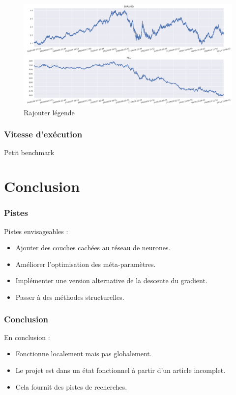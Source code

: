 \documentclass{beamer}
\begin{document}
	\begin{frame}
		\begin{figure}
			\includegraphics[scale=0.275]{res/eursud_2006-2010}
			\caption{Rajouter légende}
		\end{figure}
	\end{frame}

	\begin{frame}
		\frametitle{Vitesse d'exécution}
		Petit benchmark
	\end{frame}

	\section{Conclusion}
	
	\begin{frame}
		\frametitle{Pistes}
		Pistes envisageables :
		\begin{itemize}
			\item Ajouter des couches cachées au réseau de neurones.
			\item Améliorer l'optimisation des méta-paramètres.
			\item Implémenter une version alternative de la descente du gradient.
			\item Passer à des méthodes structurelles.
		\end{itemize}
	\end{frame}

	\begin{frame}
		\frametitle{Conclusion}
		En conclusion :
		\begin{itemize}
			\item Fonctionne localement mais pas globalement.
			\item Le projet est dans un état fonctionnel à partir d'un article incomplet.
			\item Cela fournit des pistes de recherches.
		\end{itemize}
	\end{frame}
	
\end{document}
